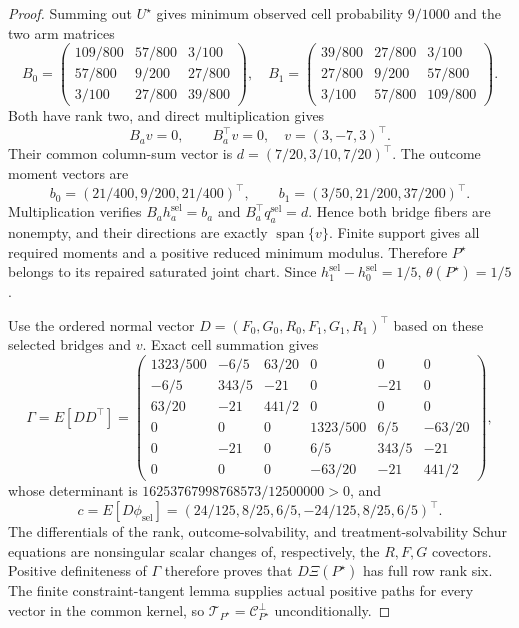 \documentclass{article}
\begin{document}
\begin{proof}
Summing out \(U^\star\) gives minimum observed cell probability \(9/1000\) and the two arm matrices
\[
B_0=\begin{pmatrix}
109/800&57/800&3/100\\
57/800&9/200&27/800\\
3/100&27/800&39/800
\end{pmatrix},
\quad
B_1=\begin{pmatrix}
39/800&27/800&3/100\\
27/800&9/200&57/800\\
3/100&57/800&109/800
\end{pmatrix}.
\]
Both have rank two, and direct multiplication gives
\[
B_av=0,\qquad B_a^\top v=0,
\quad v=(3,-7,3)^\top.
\]
Their common column-sum vector is \(d=(7/20,3/10,7/20)^\top\).  The outcome moment vectors are
\[
b_0=(21/400,9/200,21/400)^\top,
\qquad b_1=(3/50,21/200,37/200)^\top.
\]
Multiplication verifies \(B_ah_a^{\mathrm{sel}}=b_a\) and
\(B_a^\top q_a^{\mathrm{sel}}=d\).  Hence both bridge fibers are nonempty, and their directions are exactly \(\operatorname{span}\{v\}\).  Finite support gives all required moments and a positive reduced minimum modulus.  Therefore \(P^\star\) belongs to its repaired saturated joint chart.  Since \(h_1^{\mathrm{sel}}-h_0^{\mathrm{sel}}=1/5\), \(\theta(P^\star)=1/5\).

Use the ordered normal vector \(D=(F_0,G_0,R_0,F_1,G_1,R_1)^\top\) based on these selected bridges and \(v\).  Exact cell summation gives
\[
\Gamma=E[DD^\top]=
\begin{pmatrix}
1323/500&-6/5&63/20&0&0&0\\
-6/5&343/5&-21&0&-21&0\\
63/20&-21&441/2&0&0&0\\
0&0&0&1323/500&6/5&-63/20\\
0&-21&0&6/5&343/5&-21\\
0&0&0&-63/20&-21&441/2
\end{pmatrix},
\]
whose determinant is \(16253767998768573/12500000>0\), and
\[
c=E[D\phi_{\mathrm{sel}}]
=(24/125,8/25,6/5,-24/125,8/25,6/5)^\top.
\]
The differentials of the rank, outcome-solvability, and treatment-solvability Schur equations are nonsingular scalar changes of, respectively, the \(R,F,G\) covectors.  Positive definiteness of \(\Gamma\) therefore proves that \(D\Xi(P^\star)\) has full row rank six.  The finite constraint-tangent lemma supplies actual positive paths for every vector in the common kernel, so
\(\mathcal T_{P^\star}=\mathcal C_{P^\star}^\perp\) unconditionally.


\end{proof}
\end{document}

